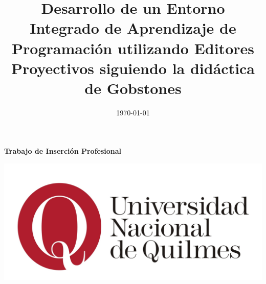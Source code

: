 \documentclass{article}
\title{Desarrollo de un Entorno Integrado de Aprendizaje de Programación
utilizando Editores Proyectivos siguiendo la didáctica de Gobstones}
\date{\today}
\begin{document}
\begin{titlepage}

\newcommand{\HRule}{\rule{\linewidth}{0.5mm}} %

\begin{center}




{ \huge \bfseries Trabajo de Inserción Profesional}\\[0.4cm] %

\bigskip
\bigskip
\bigskip
\bigskip
\bigskip
\bigskip
 


\bigskip
\bigskip
\bigskip

\includegraphics[width=\textwidth,height=\textheight,keepaspectratio]{assets/logo-unq.jpg}\\[1cm]
\end{center}

\newpage
\tableofcontents


\end{titlepage}

\maketitle
 



\newpage
\printbibliography
\end{document}
